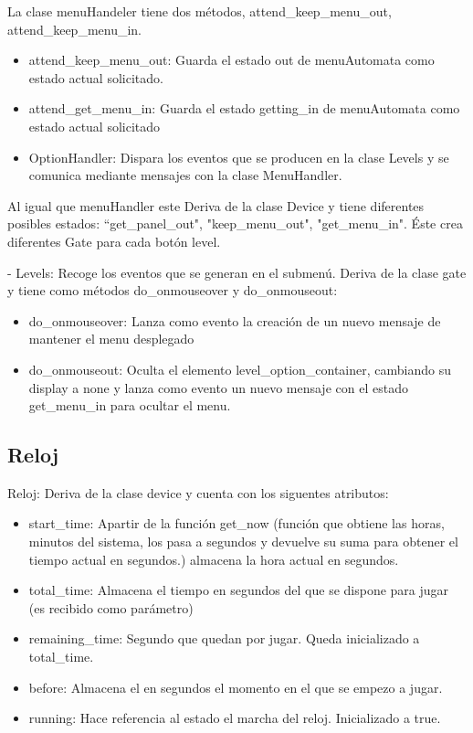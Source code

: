 La clase menuHandeler tiene dos métodos, attend\_keep\_menu\_out, attend\_keep\_menu\_in.
\begin{itemize}
 \item attend\_keep\_menu\_out: Guarda el estado out de menuAutomata como estado actual solicitado.

 \item attend\_get\_menu\_in: Guarda el estado getting\_in de menuAutomata como estado actual solicitado

 \item OptionHandler: Dispara los eventos que se producen en la clase Levels y se comunica mediante mensajes con la clase MenuHandler.
\end{itemize}

Al igual que menuHandler este Deriva de la clase Device  y tiene diferentes posibles estados:
“get\_panel\_out", "keep\_menu\_out", "get\_menu\_in".
Éste crea diferentes Gate para cada botón level.

- Levels: Recoge los eventos que se generan en el submenú. 
Deriva de la clase gate y tiene como métodos do\_onmouseover y do\_onmouseout:

\begin{itemize}
 \item do\_onmouseover: Lanza como evento la creación de un nuevo mensaje de mantener el menu desplegado

 \item do\_onmouseout: Oculta el elemento level\_option\_container, cambiando su display a none y lanza como evento un nuevo mensaje con el estado 
get\_menu\_in para ocultar el menu.
\end{itemize}


\subsection{Reloj}
\label{subsection:reloj}

Reloj: Deriva de la clase device y cuenta con los siguentes atributos:

\begin{itemize}
 \item start\_time: Apartir de la función get\_now (función que obtiene las horas, minutos del sistema, los pasa a segundos y devuelve su suma para 
obtener el tiempo actual en segundos.) almacena la hora actual en segundos.
 \item total\_time: Almacena el tiempo en segundos del que se dispone para jugar (es recibido como parámetro)
 \item remaining\_time: Segundo que quedan por jugar. Queda inicializado a total\_time.
 \item before: Almacena el en segundos el momento en el que se empezo a jugar.
 \item running: Hace referencia al estado el marcha del reloj. Inicializado a true.
\end{itemize}

